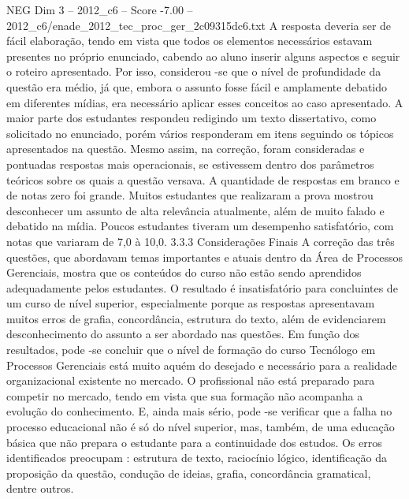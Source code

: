 \begin{textsample}{NEG Dim 3 – 2012\_c6 – Score -7.00 – 2012\_c6/enade\_2012\_tec\_proc\_ger\_2c09315dc6.txt}
A resposta deveria ser de fácil elaboração, tendo em vista que todos os elementos necessários estavam presentes no próprio enunciado, cabendo ao aluno inserir alguns aspectos e seguir o roteiro apresentado.
Por isso, considerou -se que o nível de profundidade da questão era médio, já que, embora o assunto fosse fácil e amplamente debatido em diferentes mídias, era necessário aplicar esses conceitos ao caso apresentado.
A maior parte dos estudantes respondeu redigindo um texto dissertativo, como solicitado no enunciado, porém vários responderam em itens seguindo os tópicos apresentados na questão.
Mesmo assim, na correção, foram consideradas e pontuadas respostas mais operacionais, se estivessem dentro dos parâmetros teóricos sobre os quais a questão versava.
A quantidade de respostas em branco e de notas zero foi grande.
Muitos estudantes que realizaram a prova mostrou desconhecer um assunto de alta relevância atualmente, além de muito falado e debatido na mídia.
Poucos estudantes tiveram um desempenho satisfatório, com notas que variaram de 7,0 à 10,0. 3.3.3 Considerações Finais A correção das três questões, que abordavam temas importantes e atuais dentro da Área de Processos Gerenciais, mostra que os conteúdos do curso não estão sendo aprendidos adequadamente pelos estudantes.
O resultado é insatisfatório para concluintes de um curso de nível superior, especialmente porque as respostas apresentavam muitos erros de grafia, concordância, estrutura do texto, além de evidenciarem desconhecimento do assunto a ser abordado nas questões.
Em função dos resultados, pode -se concluir que o nível de formação do curso Tecnólogo em Processos Gerenciais está muito aquém do desejado e necessário para a realidade organizacional existente no mercado.
O profissional não está preparado para competir no mercado, tendo em vista que sua formação não acompanha a evolução do conhecimento.
E, ainda mais sério, pode -se verificar que a falha no processo educacional não é só do nível superior, mas, também, de uma educação básica que não prepara o estudante para a continuidade dos estudos.
Os erros identificados preocupam : estrutura de texto, raciocínio lógico, identificação da proposição da questão, condução de ideias, grafia, concordância gramatical, dentre outros.

\end{textsample}
